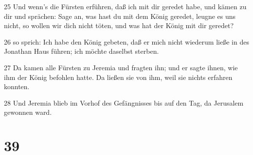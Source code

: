 \par 25 Und wenn's die Fürsten erführen, daß ich mit dir geredet habe, und kämen zu dir und sprächen: Sage an, was hast du mit dem König geredet, leugne es uns nicht, so wollen wir dich nicht töten, und was hat der König mit dir geredet?
\par 26 so sprich: Ich habe den König gebeten, daß er mich nicht wiederum ließe in des Jonathan Haus führen; ich möchte daselbst sterben.
\par 27 Da kamen alle Fürsten zu Jeremia und fragten ihn; und er sagte ihnen, wie ihm der König befohlen hatte. Da ließen sie von ihm, weil sie nichts erfahren konnten.
\par 28 Und Jeremia blieb im Vorhof des Gefängnisses bis auf den Tag, da Jerusalem gewonnen ward.

\chapter{39}

